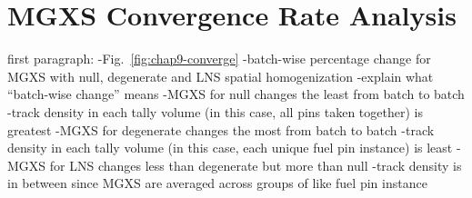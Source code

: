


\section{MGXS Convergence Rate Analysis}
\label{sec:chap9-convergence}

first paragraph: 
-Fig.~\ref{fig:chap9-converge}
  -batch-wise percentage change for \ac{MGXS} with null, degenerate and \ac{LNS} spatial homogenization
  -explain what ``batch-wise change'' means
-\ac{MGXS} for null changes the least from batch to batch
  -track density in each tally volume (in this case, all pins taken together) is greatest
-\ac{MGXS} for degenerate changes the most from batch to batch
  -track density in each tally volume (in this case, each unique fuel pin instance) is least
-\ac{MGXS} for \ac{LNS} changes less than degenerate but more than null
  -track density is in between since \ac{MGXS} are averaged across groups of like fuel pin instance


